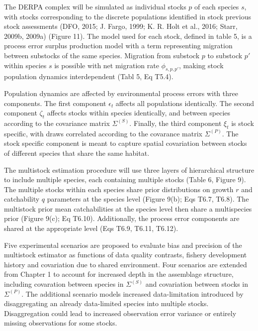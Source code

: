 \documentclass[12pt,]{scrartcl}
\begin{document}
The DERPA complex will be simulated as individual stocks \(p\) of each
species \(s\), with stocks corresponding to the discrete populations
identified in stock previous stock assessments (DFO, 2015; J. Fargo,
1999; K. R. Holt et al., 2016; Starr, 2009b, 2009a) (Figure 11). The
model used for each stock, defined in table 5, is a process error
surplus production model with a term representing migration between
substocks of the same species. Migration from substock \(p\) to substock
\(p'\) within species \(s\) is possible with net migration rate
\(\phi_{s,p,p'}\), making stock population dynamics interdependent (Tabl
5, Eq T5.4).

Population dynamics are affected by environmental process errors with
three components. The first component \(\epsilon_t\) affects all
populations identically. The second component \(\zeta_t\) affects stocks
within species identically, and between species according to the
covariance matrix \(\Sigma^{(S)}\). Finally, the third component
\(\xi_t\) is stock specific, with draws correlated according to the
covarance matrix \(\Sigma^{(P)}\). The stock specific component is meant
to capture spatial covariation between stocks of different species that
share the same habitat.

The multistock estimation procedure will use three layers of
hierarchical structure to include multiple species, each containing
multiple stocks (Table 6, Figure 9). The multiple stocks within each
species share prior distributions on growth \(r\) and catchability \(q\)
parameters at the species level (Figure 9(b); Eqs T6.7, T6.8). The
multistock prior mean catchabilities at the species level then share a
multispecies prior (Figure 9(c); Eq T6.10). Additionally, the process
error components are shared at the appropriate level (Eqs T6.9, T6.11,
T6.12).

Five experimental scenarios are proposed to evaluate bias and precision
of the multistock estimator as functions of data quality contrasts,
fishery development history and covariation due to shared environment.
Four scenarios are extended from Chapter 1 to account for increased
depth in the assemblage structure, including covaration between species
in \(\Sigma^{(S)}\) and covariation between stocks in \(\Sigma^{(P)}\).
The additional scenario models increased data-limitation introduced by
disaggregating an already data-limited species into multiple stocks.
Disaggregation could lead to increased observation error variance or
entirely missing observations for some stocks.
\end{document}
